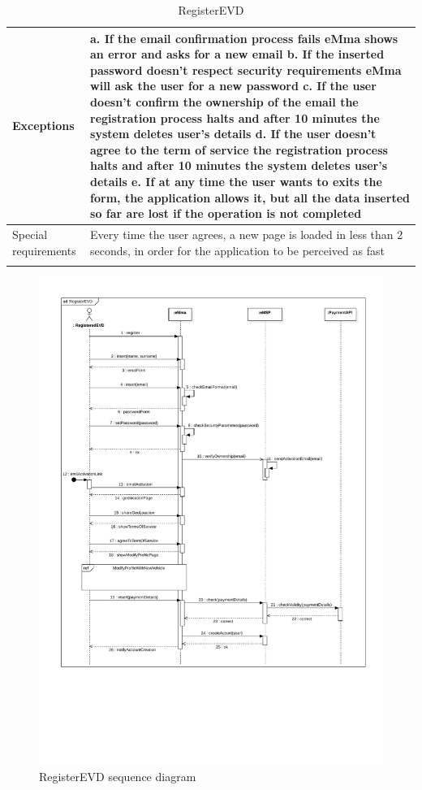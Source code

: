 \begin{center}
\begin{longtable}{p{4cm} p{11cm}}
     \hline
     Exceptions &  
        a. If the email confirmation process fails eMma shows an error and asks for a new email\newline
        b. If the inserted password doesn't respect security requirements eMma will ask the user for a new password \newline
        c. If the user doesn't confirm the ownership of the email the registration process halts and after 10 minutes the system deletes user's details \newline
        d. If the user doesn't agree to the term of service the registration process halts and after 10 minutes the system deletes user's details \newline
        e. If at any time the user wants to exits the form, the application allows it, but all the data inserted so far are lost if the operation is not completed \\
     \hline
     Special requirements &  Every time the user agrees, a new page is loaded in less than 2 seconds, in order for the application to be perceived as fast \\
     \hline
    \caption{RegisterEVD}
    \label{tab:RegisterEVD}
    \end{longtable}
\end{center}
\begin{figure}[H]
    \centering
    \includegraphics[width=1\textwidth, trim={1cm 5cm 0 1.2cm}, clip]{Images/cp3/seqDiagrams/RegisterEVD.pdf}
    \caption{RegisterEVD sequence diagram}
\end{figure}
\pagebreak

